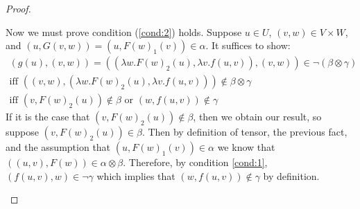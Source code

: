 \begin{proof}
\begin{itemize}
    Now we must prove condition (\ref{cond:2}) holds.  Suppose $u
    \in U$, $(v,w) \in V \times W$, and $(u,G(v,w)) = (u,F(w)_1(v))
    \in \alpha$.  It suffices to show:
    \[
    \begin{array}{lll}
      (g(u),(v,w)) = ((\lambda w.F(w)_2(u),\lambda v.f(u,v)),(v,w)) \in \lnot (\beta \otimes \gamma)\\
      \text{iff } ((v,w),(\lambda w.F(w)_2(u),\lambda v.f(u,v))) \not\in \beta \otimes \gamma\\
      \text{iff } (v,F(w)_2(u)) \not\in \beta \text { or } (w,f(u,v)) \not\in \gamma
    \end{array}
    \]
    If it is the case that $(v,F(w)_2(u)) \not\in \beta$, then we
    obtain our result, so suppose $(v,F(w)_2(u)) \in \beta$.  Then by
    definition of tensor, the previous fact, and the assumption that
    $(u,F(w)_1(v)) \in \alpha$ we know that $((u,v),F(w)) \in \alpha
    \otimes \beta$.  Therefore, by condition \ref{cond:1}, $(f(u,v),w)
    \in \lnot \gamma$ which implies that $(w,f(u,v)) \not\in \gamma$
    by definition.
    

\end{itemize}
\end{proof}
